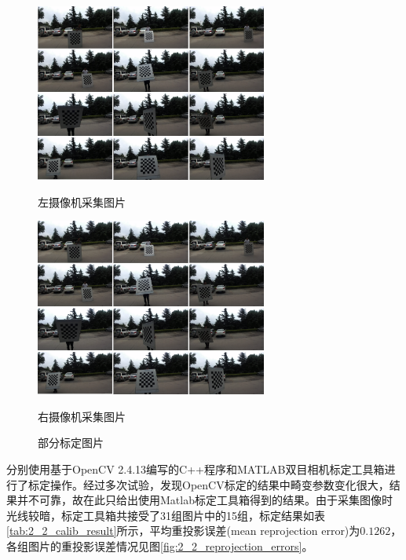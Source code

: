\begin{figure}[!htb] %
	\centering
	\begin{minipage}[c]{0.48\textwidth}
		\centering
		\includegraphics[width=3in]{figures/2_2_calib/left_4x3}
		\centerline{\small{左摄像机采集图片}}
	\end{minipage}
	\hfill
	\begin{minipage}[c]{0.48\textwidth}
		\centering
		\includegraphics[width=3in]{figures/2_2_calib/right_4x3}
		\centerline{\small{右摄像机采集图片}}
	\end{minipage}
	\caption{部分标定图片}\label{fig:2_2_calib_imgs}
\end{figure}

分别使用基于OpenCV 2.4.13编写的C++程序和MATLAB双目相机标定工具箱进行了标定操作。经过多次试验，发现OpenCV标定的结果中畸变参数变化很大，结果并不可靠，故在此只给出使用Matlab标定工具箱得到的结果。由于采集图像时光线较暗，标定工具箱共接受了31组图片中的15组，标定结果如表\ref{tab:2_2_calib_result}所示，平均重投影误差(mean reprojection error)为$0.1262$， 各组图片的重投影误差情况见图\ref{fig:2_2_reprojection_errors}。

